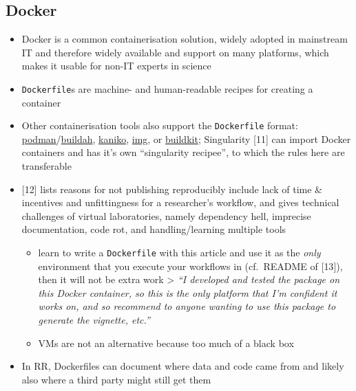 \documentclass[10pt,letterpaper]{article}
\providecommand{\tightlist}{%
  \setlength{\itemsep}{0pt}\setlength{\parskip}{0pt}}
\begin{document}
\hypertarget{docker}{%
\subsection*{Docker}\label{docker}}

\begin{itemize}
\tightlist
\item
  Docker is a common containerisation solution, widely adopted in
  mainstream IT and therefore widely available and support on many
  platforms, which makes it usable for non-IT experts in science
\item
  \texttt{Dockerfile}s are machine- and human-readable recipes for
  creating a container
\item
  Other containerisation tools also support the \texttt{Dockerfile}
  format:
  \href{https://podman.io/}{podman}/\href{https://github.com/containers/buildah}{buildah},
  \href{https://github.com/GoogleContainerTools/kaniko}{kaniko},
  \href{https://github.com/genuinetools/img}{img}, or
  \href{https://github.com/moby/buildkit}{buildkit}; Singularity
  {[}11{]} can import Docker containers and has it's own ``singularity
  recipee'', to which the rules here are transferable
\item
  {[}12{]} lists reasons for not publishing reproducibly include lack of
  time \& incentives and unfittingness for a researcher's workflow, and
  gives technical challenges of virtual laboratories, namely dependency
  hell, imprecise documentation, code rot, and handling/learning
  multiple tools

  \begin{itemize}
  \tightlist
  \item
    learn to write a \texttt{Dockerfile} with this article and use it as
    the \emph{only} environment that you execute your workflows in
    (cf.~README of {[}13{]}), then it will not be extra work
    \textgreater{} \emph{``I developed and tested the package on this
    Docker container, so this is the only platform that I'm confident it
    works on, and so recommend to anyone wanting to use this package to
    generate the vignette, etc.''}
  \item
    VMs are not an alternative because too much of a black box
  \end{itemize}
\item
  In RR, Dockerfiles can document where data and code came from and
  likely also where a third party might still get them
\end{itemize}
\end{document}
